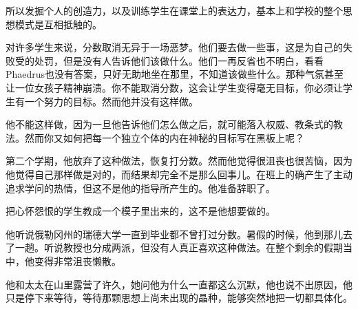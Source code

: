 \documentclass[UTF8]{article}
\begin{document}
\par 所以发掘个人的创造力，以及训练学生在课堂上的表达力，基本上和学校的整个思想模式是互相抵触的。
\par 对许多学生来说，分数取消无异于一场恶梦。他们要去做一些事，这是为自己的失败受的处罚，但是没有人告诉他们该做什么。他们一再反省也不明白，看看Phaedrus也没有答案，只好无助地坐在那里，不知道该做些什么。那种气氛甚至让一位女孩子精神崩溃。你不能取消分数，这会让学生变得毫无目标，你必须让学生有一个努力的目标。然而他并没有这样做。
\par 他不能这样做，因为一旦他告诉他们怎么做之后，就可能落入权威、教条式的教法。然而你又如何把每一个独立个体的内在神秘的目标写在黑板上呢？
\par 第二个学期，他放弃了这种做法，恢复打分数。然而他觉得很沮丧也很苦恼，因为他觉得自己那样做是对的，而结果却完全不是那么回事儿。在班上的确产生了主动追求学问的热情，但这不是他的指导所产生的。他准备辞职了。
\par 把心怀怨恨的学生教成一个模子里出来的，这不是他想要做的。
\par 他听说俄勒冈州的瑞德大学一直到毕业都不曾打过分数。暑假的时候，他到那儿去了一趟。听说教授也分成两派，但没有人真正喜欢这种做法。在整个剩余的假期当中，他变得非常沮丧懒散。
\par 他和太太在山里露营了许久，她问他为什么一直都这么沉默，他也说不出原因，他只是停下来等待，等待那颗思想上尚未出现的晶种，能够突然地把一切都具体化。
\end{document}
